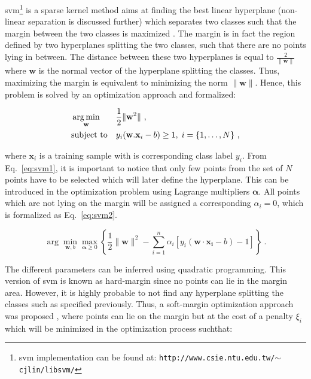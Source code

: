 \Acf{svm}\footnote{\ac{svm} implementation can be found at: \texttt{http://www.csie.ntu.edu.tw/\allowbreak $\sim$cjlin/libsvm/}} is a sparse kernel method aims at finding the best linear hyperplane (non-linear separation is discussed further) which separates two classes such that the margin between the two classes is maximized \cite{Vapnik1963}.
The margin is in fact the region defined by two hyperplanes splitting the two classes, such that there are no points lying in between.
The distance between these two hyperplanes is equal to $\frac{2}{\|\mathbf{w}\|}$ where $\mathbf{w}$ is the normal vector of the hyperplane splitting the classes.
Thus, maximizing the margin is equivalent to minimizing the norm $\|\mathbf{w}\|$.
Hence, this problem is solved by an optimization approach and formalized:

\begin{equation}
\begin{aligned}
& \operatorname*{arg\,min}_{\mathbf{w}}
& & \frac{1}{2} \| \mathbf{w}^2\| \ , \\
& \text{subject to}
& & y_i(\mathbf{w}.\mathbf{x}_i - b) \geq 1, \; i = \{ 1, \ldots, N \} \ ,
\end{aligned}
\label{eq:svm1}
\end{equation}

\noindent where $\mathbf{x}_i$ is a training sample with is corresponding class label $y_i$.
From Eq.~\eqref{eq:svm1}, it is important to notice that only few points from the set of $N$ points have to be selected which will later define the hyperplane.
This can be introduced in the optimization problem using Lagrange multipliers $\boldsymbol{\alpha}$.
All points which are not lying on the margin will be assigned a corresponding $\alpha_i = 0$, which is formalized as Eq.~\eqref{eq:svm2}.

\begin{equation}
	\arg\min_{\mathbf{w},b } \max_{\boldsymbol{\alpha}\geq 0 } \left\{ \frac{1}{2}\|\mathbf{w}\|^2 - \sum_{i=1}^{n}{\alpha_i[y_i(\mathbf{w}\cdot \mathbf{x_i} - b)-1]} \right\} \ .
	\label{eq:svm2}
\end{equation}

The different parameters can be inferred using quadratic programming.
This version of \ac{svm} is known as hard-margin since no points can lie in the margin area.
However, it is highly probable to not find any hyperplane splitting the classes such as specified previously.
Thus, a soft-margin optimization approach was proposed \cite{Cortes1995}, where points can lie on the margin but at the cost of a penalty $\xi_i$ which will be minimized in the optimization process suchthat:

